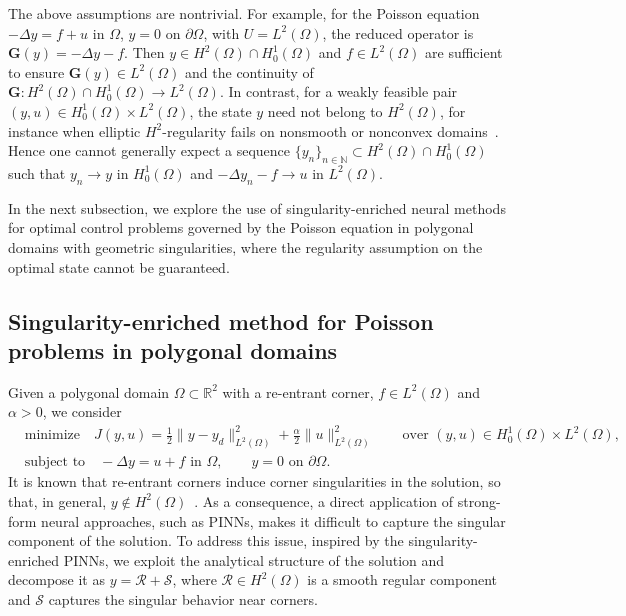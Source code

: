 \documentclass{article}
\numberwithin{equation}{section}
\begin{document}
The above assumptions are nontrivial. For example, for the Poisson equation
$-\Delta y=f+u$ in $\Omega$, $y=0$ on $\partial\Omega$, with $U=L^2(\Omega)$, the
reduced operator is $\mathbf{G}(y)=-\Delta y-f$. Then
$y\in H^2(\Omega)\cap H^1_0(\Omega)$ and $f\in L^2(\Omega)$ are sufficient to
ensure $\mathbf{G}(y)\in L^2(\Omega)$ and the continuity of
$\mathbf{G}:H^2(\Omega)\cap H^1_0(\Omega)\to L^2(\Omega)$. In contrast, for a
weakly feasible pair $(y,u)\in H^1_0(\Omega)\times L^2(\Omega)$, the state $y$
need not belong to $H^2(\Omega)$, for instance when elliptic $H^2$-regularity
fails on nonsmooth or nonconvex domains~\cite{dauge2006elliptic}. Hence one cannot generally expect a
sequence $\{y_n\}_{n\in\mathbb N}\subset H^2(\Omega)\cap H^1_0(\Omega)$ such
that $y_n\to y$ in $H^1_0(\Omega)$ and $-\Delta y_n-f\to u$ in $L^2(\Omega)$.

In the next subsection, we explore the use of singularity-enriched neural methods for optimal control problems governed by the Poisson equation in polygonal domains with geometric singularities, where the regularity assumption on the optimal state cannot be guaranteed.

\subsection{Singularity-enriched method for Poisson problems in polygonal domains}\label{sec:singularity}

Given a polygonal domain $\Omega\subset\mathbb{R}^2$ with a re-entrant corner, $f\in L^2(\Omega)$ and $\alpha>0$, we consider 
\begin{align*}
    &\text{minimize}\quad J(y,u)=\frac{1}{2}\|y-y_d\|_{L^2(\Omega)}^2 + \frac{\alpha}{2}\|u\| _{L^2(\Omega)}^2\qquad \text{over }(y,u)\in H^1_0(\Omega)\times L^2(\Omega),\\
&\text{subject to}\quad -\Delta y = u+f  \text{ in } \Omega, 
\qquad y = 0  \text{ on } \partial \Omega.
\end{align*}
It is known that re-entrant corners induce corner singularities in the solution,
so that, in general, $y\notin H^2(\Omega)$~\cite{dauge2006elliptic}. As a consequence, a direct application of strong-form neural approaches, such as PINNs, makes it difficult to capture the singular component of the solution. To address this issue, inspired by the singularity-enriched PINNs\cite{hu2024solving}, we exploit the analytical structure of the solution and decompose it as
$y = \mathcal{R} + \mathcal{S}$,
where $\mathcal{R} \in H^2(\Omega)$ is a smooth regular component and $\mathcal{S}$ captures the singular behavior near corners.
\end{document}
